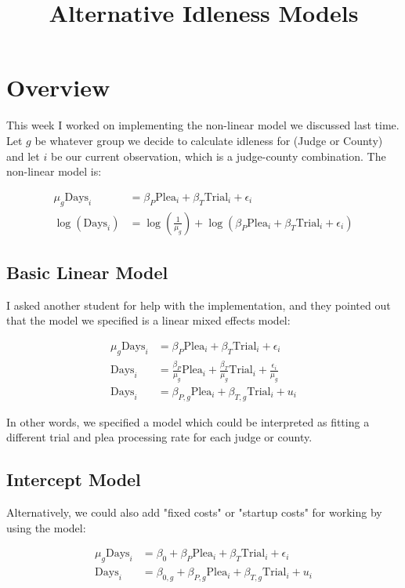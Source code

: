 \documentclass[11pt]{article}
\title{Alternative Idleness Models}
\begin{document}
\maketitle

\section{Overview}
  This week I worked on implementing the non-linear model we discussed last time. Let $g$ be whatever group we decide to calculate idleness for (Judge or County) and let $i$ be our current observation, which is a judge-county combination. The non-linear model is:

  \begin{align*}
    \mu_g \text{Days}_i &= \beta_P \text{Plea}_i + \beta_T \text{Trial}_i + \epsilon_i\\
    \log(\text{Days}_i) &= \log(\frac{1}{\mu_g}) + \log(\beta_P \text{Plea}_i + \beta_T \text{Trial}_i + \epsilon_i)
  \end{align*}

  \subsection{Basic Linear Model}
    I asked another student for help with the implementation, and they pointed out that the model we specified is a linear mixed effects model:

    \begin{align*}
      \mu_g \text{Days}_i &= \beta_P \text{Plea}_i + \beta_T \text{Trial}_i + \epsilon_i\\
      \text{Days}_i &= \frac{\beta_P}{\mu_g} \text{Plea}_i + \frac{\beta_T}{\mu_g} \text{Trial}_i + \frac{\epsilon_i}{\mu_g}\\
      \text{Days}_i &= \beta_{P,g} \text{Plea}_i + \beta_{T,g} \text{Trial}_i + u_i
    \end{align*}

    In other words, we specified a model which could be interpreted as fitting a different trial and plea processing rate for each judge or county.

  \subsection{Intercept Model}
    Alternatively, we could also add "fixed costs" or "startup costs" for working by using the model:

    \begin{align}
      \mu_g \text{Days}_i &= \beta_0 + \beta_P \text{Plea}_i + \beta_T \text{Trial}_i + \epsilon_i\\
      \text{Days}_i &= \beta_{0,g} + \beta_{P,g} \text{Plea}_i + \beta_{T,g} \text{Trial}_i + u_i
    \end{align}
\end{document}
